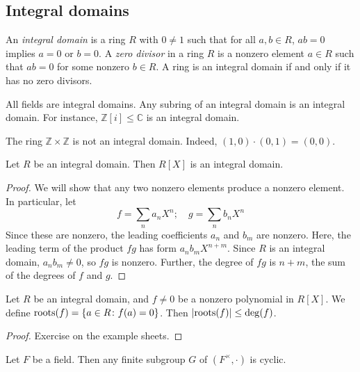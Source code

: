 \subsection{Integral domains}
\begin{definition}
	An \textit{integral domain} is a ring \( R \) with \( 0 \neq 1 \) such that for all \( a, b \in R \), \( a b = 0 \) implies \( a = 0 \) or \( b = 0 \).
	A \textit{zero divisor} in a ring \( R \) is a nonzero element \( a \in R \) such that \( a b = 0 \) for some nonzero \( b \in R \).
	A ring is an integral domain if and only if it has no zero divisors.
\end{definition}
\begin{example}
	All fields are integral domains.
	Any subring of an integral domain is an integral domain.
	For instance, \( \mathbb Z[i] \leq \mathbb C \) is an integral domain.
\end{example}
\begin{example}
	The ring \( \mathbb Z \times \mathbb Z \) is not an integral domain.
	Indeed, \( (1,0) \cdot (0,1) = (0,0) \).
\end{example}
\begin{lemma}
	Let \( R \) be an integral domain.
	Then \( R[X] \) is an integral domain.
\end{lemma}
\begin{proof}
	We will show that any two nonzero elements produce a nonzero element.
	In particular, let
	\[
		f = \sum_n a_n X^n;\quad g = \sum_n b_n X^n
	\]
	Since these are nonzero, the leading coefficients \( a_n \) and \( b_m \) are nonzero.
	Here, the leading term of the product \( fg \) has form \( a_n b_m X^{n+m} \).
	Since \( R \) is an integral domain, \( a_n b_m \neq 0 \), so \( fg \) is nonzero.
	Further, the degree of \( fg \) is \( n + m \), the sum of the degrees of \( f \) and \( g \).
\end{proof}
\begin{lemma}
	Let \( R \) be an integral domain, and \( f \neq 0 \) be a nonzero polynomial in \( R[X] \).
	We define \( \mathrm{roots}(f) = \qty{a \in R \colon f(a) = 0} \).
	Then \( \abs{\mathrm{roots}(f)} \leq \mathrm{deg}(f) \).
\end{lemma}
\begin{proof}
	Exercise on the example sheets.
\end{proof}
\begin{theorem}
	Let \( F \) be a field.
	Then any finite subgroup \( G \) of \( (F^\times, \cdot) \) is cyclic.
\end{theorem}
